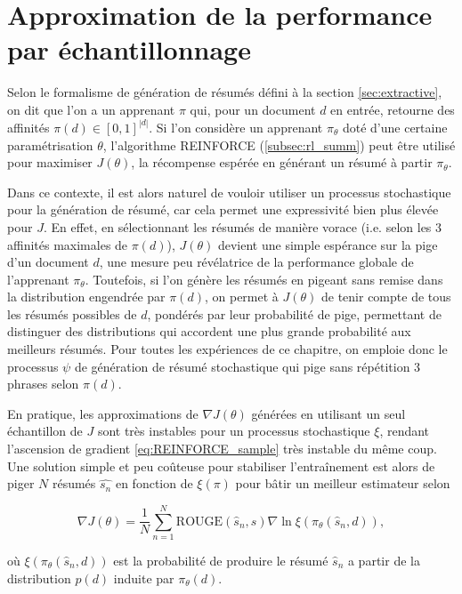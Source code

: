 \section{Approximation de la performance par échantillonnage}
\label{section:echantillonnage}

Selon le formalisme de génération de résumés défini à la section \ref{sec:extractive},
on dit que l'on a un apprenant $\pi$ qui, pour un document $d$ en entrée, retourne
des affinités $\pi(d) \in [0,1]^{|d|}$.
Si l'on considère un apprenant $\pi_\theta$ doté d'une certaine paramétrisation $\theta$,
l'algorithme REINFORCE (\ref{subsec:rl_summ}) peut être utilisé pour 
maximiser $J(\theta)$, la récompense espérée en générant
un résumé à partir $\pi_\theta$.

Dans ce contexte, il est alors naturel de vouloir utiliser un processus stochastique 
pour la génération de résumé, car cela permet une expressivité 
bien plus élevée pour $J$.
En effet, en sélectionnant les résumés de manière vorace (i.e. selon 
les 3 affinités maximales de $\pi(d)$), $J(\theta)$ devient une simple 
espérance sur la pige d'un document $d$, une mesure peu révélatrice 
de la performance globale de l'apprenant $\pi_\theta$.
Toutefois, si l'on génère les résumés en pigeant sans remise dans 
la distribution engendrée par $\pi(d)$, on permet à $J(\theta)$
de tenir compte de tous les résumés possibles de $d$, pondérés par leur probabilité de pige,
permettant de distinguer des distributions qui accordent une plus grande probabilité aux
meilleurs résumés.
Pour toutes les expériences de ce chapitre, on emploie donc le processus $\psi$ de génération de résumé stochastique
qui pige sans répétition 3 phrases selon $\pi(d)$.

En pratique, les approximations de $\nabla J(\theta)$ générées en utilisant un seul
échantillon de $J$ sont très instables pour un processus stochastique $\xi$,
rendant l'ascension de gradient \eqref{eq:REINFORCE_sample} très instable du même coup.
Une solution simple et peu coûteuse pour stabiliser l'entraînement est alors de piger $N$
résumés $\hat{s_n}$ en fonction de $\xi(\pi)$ pour bâtir un meilleur estimateur selon

\begin{equation}
    \nabla J(\theta) = \frac{1}{N} \sum_{n=1}^N \text{ROUGE}(\hat{s}_n, s) \nabla \ln \xi\left( \pi_\theta(\hat{s}_n, d)\right),
    \label{eq:REINFORCE_samples}
\end{equation}

où $\xi\left( \pi_\theta(\hat{s}_n, d)\right)$ est la probabilité de produire le résumé $\hat{s}_n$
a partir de la distribution $p(d)$ induite par $\pi_\theta(d)$.

